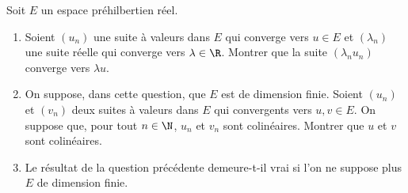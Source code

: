 \begin{enonce}
\begin{exercise}[ID={RMS133 E710},subtitle={Mines-Ponts 2022},tags={},difficulty={}]
Soit $E$ un espace préhilbertien réel.
\begin{enumerate}
  \item Soient $(u_n)$ une suite à valeurs dans $E$ qui converge vers $u\in E$ et $(\lambda_n)$ une suite réelle qui converge vers $\lambda\in\R$.
    Montrer que la suite $\left( \lambda_n u_n \right)$ converge vers $\lambda u$.

  \item On suppose, dans cette question, que $E$ est de dimension finie.
    Soient $(u_n)$ et $(v_n)$ deux suites à valeurs dans $E$ qui convergents vers $u,v\in E$.
    On suppose que, pour tout $n\in\N$, $u_n$ et $v_n$ sont colinéaires.
    Montrer que $u$ et $v$ sont colinéaires.

  \item Le résultat de la question précédente demeure-t-il vrai si l'on ne suppose plus $E$ de dimension finie.
\end{enumerate}
\end{exercise}
\begin{solution}
\end{solution}
\end{enonce}
